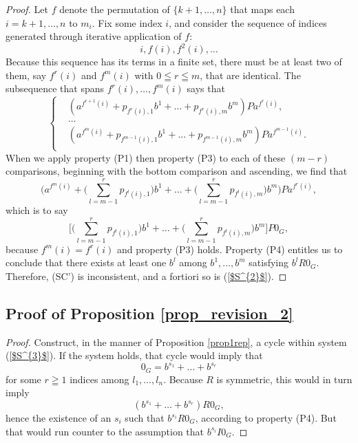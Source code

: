 \documentclass[pdflatex,sn-apa,11pt]{sn-jnl}%
\begin{document}
\begin{proof}
Let $f$ denote the permutation of $\{k+1, \dots, n\}$ that maps each $i = k+1, \dots, n$ to $m_i$. Fix some index $i$, and consider the sequence of indices generated through iterative application of $f$: \begin{equation*}i, f(i), f^{2}(i),\dots\end{equation*} 
Because this sequence has its terms in a finite set, there must be at least two of them, say $f^{r}(i)$ and $f^{m}(i)$ with $0 \leqq r \leqq m$, that are identical. The subsequence that spans $f^{r}(i), \dots, f^{m}(i)$ says that \begin{equation*}
  \left\{
    \begin{aligned}
      & (a^{f^{r+1}(i)} + p_{f^{r}(i), 1}b^1 + \dots + p_{f^{r}(i), m}b^m)Pa^{f^{r}(i)}, \\
      & \dots \\
      & (a^{f^{m}(i)} + p_{f^{m-1}(i), 1}b^1 + \dots + p_{f^{m-1}(i), m}b^m)Pa^{f^{m-1}(i)}. \\
    \end{aligned}
  \right.
\end{equation*}
When we apply property (P1) then property (P3) to each of these $(m-r)$ comparisons, beginning with the bottom comparison and ascending, we find that \begin{equation*}\Biggl(a^{f^{m}(i)} + \Biggl(\sum_{l = m-1}^{r}p_{f^{l}(i), 1}\Biggr)b^1 + \dots + \Biggl(\sum_{l = m-1}^{r}p_{f^{l}(i), m}\Biggr)b^m\Biggr)Pa^{f^{r}(i)},\end{equation*}
which is to say \begin{equation*}\Biggl[\Biggl(\sum_{l = m-1}^{r}p_{f^{l}(i), 1}\Biggr)b^1 + \dots + \Biggl(\sum_{l = m-1}^{r}p_{f^{l}(i), m}\Biggr)b^m\Biggr]P0_G,\end{equation*}
because $f^{m}(i) = f^{r}(i)$ and property (P3) holds. Property (P4) entitles us to conclude that there exists at least one $b^l$ among $b^1, \dots, b^m$ satisfying $b^lR0_G$. Therefore, (SC') is inconsistent, and a fortiori so is (\ref{$S^{2}$}).
\end{proof}

\subsection{Proof of Proposition \ref{prop_revision_2}}
\label{sec5_3}
\begin{proof}
Construct, in the manner of Proposition \ref{prop1rep}, a cycle within system (\ref{$S^{3}$}). If the system holds, that cycle would imply that \begin{equation*}0_G = b^{s_1} + \dots + b^{s_r}\end{equation*} for some $r \geqq 1$ indices among $l_1, \dots, l_n$. Because $R$ is symmetric, this would in turn imply \begin{equation*}(b^{s_1} + \dots + b^{s_r})R0_G,\end{equation*}
hence the existence of an $s_i$ such that $b^{s_i}R0_G$, according to property (P4). But that would run counter to the assumption that $b^{s_i}I0_G$.
\end{proof}
\end{document}
